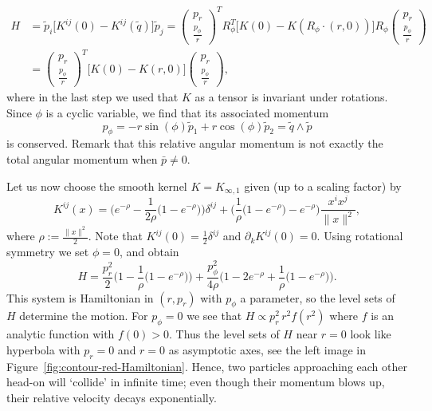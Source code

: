 \documentclass[12pt]{amsart}
\begin{document}
\begin{equation*}
  \begin{aligned}
  H &= \tilde{p}_i \big[ K^{ij}(0) - K^{ij}(\tilde{q}) \big] \tilde{p}_j
     = \begin{pmatrix} p_r \\ \frac{p_\phi}{r} \end{pmatrix}^T R_\phi^T
       \big[ K(0) - K(R_\phi\cdot(r,0)) \big] R_\phi
       \begin{pmatrix} p_r \\ \frac{p_\phi}{r} \end{pmatrix}\\
    &= \begin{pmatrix} p_r \\ \frac{p_\phi}{r} \end{pmatrix}^T
       \big[ K(0) - K(r,0) \big] \begin{pmatrix} p_r \\ \frac{p_\phi}{r} \end{pmatrix},
  \end{aligned}
\end{equation*}
where in the last step we used that $K$ as a tensor is invariant under
rotations. Since $\phi$ is a cyclic variable, we find that its
associated momentum
\begin{equation*}
  p_\phi = -r \sin(\phi) \tilde{p}_1 + r \cos(\phi) \tilde{p}_2
            = \tilde{q} \wedge \tilde{p}
\end{equation*}
is conserved. Remark that this relative angular momentum is not
exactly the total angular momentum when $\bar{p} \neq 0$.

Let us now choose the smooth kernel $K = K_{\infty,1}$ given
(up to a scaling factor) by
%
{\newcommand{\e}{e^{-\rho}}
\begin{equation*}\label{eq:smooth-kernel}
  K^{ij}(x) = \Big(\e - \frac{1}{2\rho}\big(1 - \e\big)\Big)\delta^{ij}
    + \Big(\frac{1}{\rho}\big(1 - \e\big) - \e\Big)\frac{x^i x^j}{\|x\|^2},
\end{equation*}%
}%
where $\rho := \frac{\|x\|^2}{2}$. Note that
$K^{ij}(0) = \frac{1}{2} \delta^{ij}$ and $\partial_k K^{ij}(0) = 0$.
Using rotational symmetry we set $\phi = 0$, and obtain
\begin{equation}\label{eq:H-rot-reduced}
  H = \frac{p_r^2      }{2}    \Big(1 - \frac{1}{\rho}\big(1-e^{-\rho}\big)\Big)
     +\frac{p_\phi^2}{4\rho}\Big(1 - 2e^{-\rho} + \frac{1}{\rho}\big(1-e^{-\rho}\big)\Big).
\end{equation}
This system is Hamiltonian in $(r,p_r)$ with $p_\phi$ a parameter, so
the level sets of $H$ determine the motion. For $p_\phi = 0$ we see
that $H \propto p_r^2\, r^2 f(r^2)$ where $f$ is an analytic function
with $f(0) > 0$. Thus the level sets of $H$ near $r = 0$ look like
hyperbola with $p_r = 0$ and $r = 0$ as asymptotic axes, see the left image in
Figure~\eqref{fig:contour-red-Hamiltonian}. Hence, two particles approaching
each other head-on will `collide' in infinite time; even though their
momentum blows up, their relative velocity decays exponentially.
\end{document}
